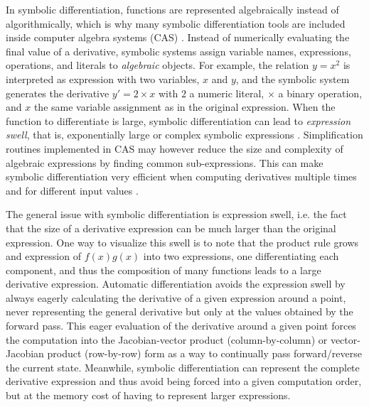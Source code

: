In symbolic differentiation, functions are represented algebraically instead of algorithmically, which is why many symbolic differentiation tools are included inside computer algebra systems (CAS) \cite{Symbolics_jl_2022}. 
Instead of numerically evaluating the final value of a derivative, symbolic systems assign variable names, expressions, operations, and literals to \textit{algebraic} objects. 
For example, the relation $y = x^2$ is interpreted as expression with two variables, $x$ and $y$, and the symbolic system generates the derivative $y' = 2 \times x$ with $2$ a numeric literal, $\times$ a binary operation, and $x$ the same variable assignment as in the original expression.
When the function to differentiate is large, symbolic differentiation can lead to \textit{expression swell}, that is, exponentially large or complex symbolic expressions \cite{Baydin_Pearlmutter_Radul_Siskind_2015}.
Simplification routines implemented in CAS may however reduce the size and complexity of algebraic expressions by finding common sub-expressions.  
This can make symbolic differentiation very efficient when computing derivatives multiple times and for different input values \cite{Dürrbaum_Klier_Hahn_2002}. 

The general issue with symbolic differentiation is expression swell, i.e. the fact that the size of a derivative expression can be much larger than the original expression. One way to visualize this swell is to note that the product rule grows and expression of $f(x)g(x)$ into two expressions, one differentiating each component, and thus the composition of many functions leads to a large derivative expression. Automatic differentiation avoids the expression swell by always eagerly calculating the derivative of a given expression around a point, never representing the general derivative but only at the values obtained by the forward pass. This eager evaluation of the derivative around a given point forces the computation into the Jacobian-vector product (column-by-column) or vector-Jacobian product (row-by-row) form as a way to continually pass forward/reverse the current state. Meanwhile, symbolic differentiation can represent the complete derivative expression and thus avoid being forced into a given computation order, but at the memory cost of having to represent larger expressions.

